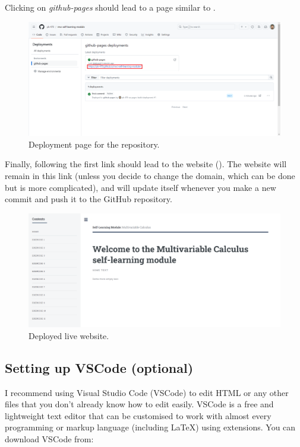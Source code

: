 \documentclass[a4paper,10pt]{article}
\begin{document}
Clicking on \emph{github-pages} should lead to a page similar to .

\begin{figure}[htbp]
    \centering
    \includegraphics[width=\textwidth]{deployment.png}
    \caption{Deployment page for the repository.}
    \label{fig:deployment}   
\end{figure}

Finally, following the first link should lead to the website (). The website will remain in this link (unless you decide to change the domain, which can be done but is more complicated), and will update itself whenever you make a new commit and push it to the GitHub repository.

\begin{figure}[htbp]
    \centering
    \includegraphics[width=\textwidth]{website.png}
    \caption{Deployed live website.}
    \label{fig:website}   
\end{figure}


\subsection{Setting up VSCode (optional)}
\label{sec:vscode}

I recommend using Visual Studio Code (VSCode) to edit HTML or any other files that you don't already know how to edit easily. VSCode is a free and lightweight text editor that can be customised to work with almost every programming or markup language (including \LaTeX) using extensions. You can download VSCode from:
\end{document}
